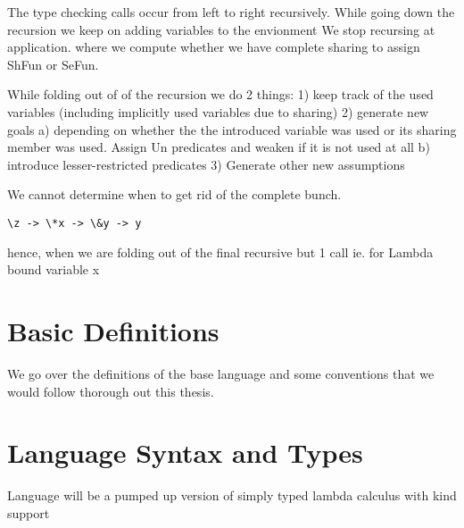 
The type checking calls occur from left to right recursively.
While going down the recursion we keep on adding variables to the envionment
We stop recursing at application. where we compute whether we have complete sharing to assign ShFun or SeFun.

While folding out of of the recursion we do 2 things:
1) keep track of the used variables (including implicitly used variables due to sharing)
2) generate new goals
   a) depending on whether the the introduced variable was used
      or its sharing member was used. Assign Un predicates and weaken if it is not used at all
   b) introduce lesser-restricted predicates
3) Generate other new assumptions

We cannot determine when to get rid of the complete bunch.
\begin{verbatim}
\z -> \*x -> \&y -> y
\end{verbatim}
hence, when we are folding out of the final recursive but 1 call ie. for Lambda bound variable x

\section{Basic Definitions}

We go over the definitions of the base language and some conventions that we would
follow thorough out this thesis.

\section{Language Syntax and Types}

Language will be a pumped up version of simply typed lambda calculus with kind support

